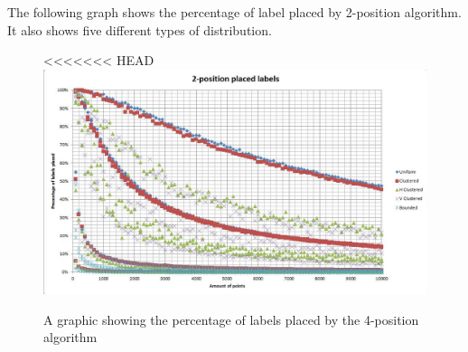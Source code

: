 \documentclass[crop=false,a4paper,oneside,11pt]{standalone}
\begin{document}
The following graph shows the percentage of label placed by 2-position algorithm. It also shows five different types of distribution.
\begin{figure}[h!]
 \centering
<<<<<<< HEAD
  \includegraphics[scale = 0.5]{2PosLabelsPlaced.JPG}\\
  \caption{A graphic showing the percentage of labels placed by the 4-position algorithm}
 \end{figure}
\end{document}
